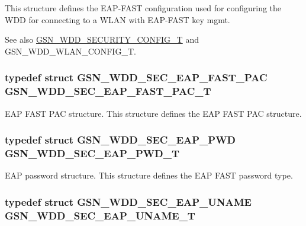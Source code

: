 This structure defines the EAP-\/FAST configuration used for configuring the WDD for connecting to a WLAN with EAP-\/FAST key mgmt. \begin{DoxySeeAlso}{See also}
\hyperlink{a00604_ab50f348fec494c964d4301472eee16de}{GSN\_\-WDD\_\-SECURITY\_\-CONFIG\_\-T} and GSN\_\-WDD\_\-WLAN\_\-CONFIG\_\-T. 
\end{DoxySeeAlso}
\hypertarget{a00604_a7ad60b3114dc38d0bf169e200f3c81df}{
\subsubsection[{GSN\_\-WDD\_\-SEC\_\-EAP\_\-FAST\_\-PAC\_\-T}]{\setlength{\rightskip}{0pt plus 5cm}typedef struct {\bf GSN\_\-WDD\_\-SEC\_\-EAP\_\-FAST\_\-PAC}  {\bf GSN\_\-WDD\_\-SEC\_\-EAP\_\-FAST\_\-PAC\_\-T}}}
\label{a00604_a7ad60b3114dc38d0bf169e200f3c81df}


EAP FAST PAC structure. This structure defines the EAP FAST PAC structure. 

\hypertarget{a00604_a24b6b0a6365311f34b8e8af6acf64711}{
\subsubsection[{GSN\_\-WDD\_\-SEC\_\-EAP\_\-PWD\_\-T}]{\setlength{\rightskip}{0pt plus 5cm}typedef struct {\bf GSN\_\-WDD\_\-SEC\_\-EAP\_\-PWD}  {\bf GSN\_\-WDD\_\-SEC\_\-EAP\_\-PWD\_\-T}}}
\label{a00604_a24b6b0a6365311f34b8e8af6acf64711}


EAP password structure. This structure defines the EAP FAST password type. 

\hypertarget{a00604_ae39e817c2244f895c6f66f5154508933}{
\subsubsection[{GSN\_\-WDD\_\-SEC\_\-EAP\_\-UNAME\_\-T}]{\setlength{\rightskip}{0pt plus 5cm}typedef struct {\bf GSN\_\-WDD\_\-SEC\_\-EAP\_\-UNAME}  {\bf GSN\_\-WDD\_\-SEC\_\-EAP\_\-UNAME\_\-T}}}
\label{a00604_ae39e817c2244f895c6f66f5154508933}


